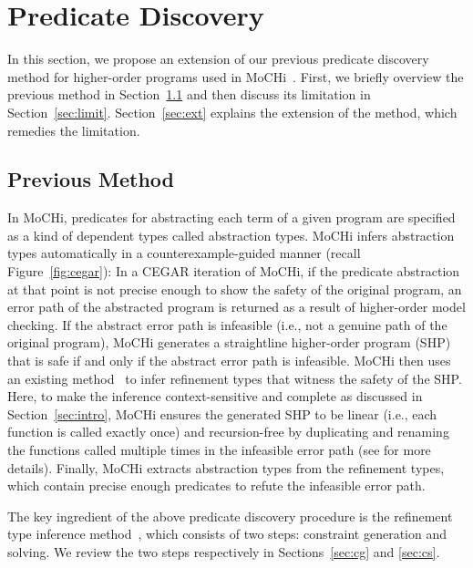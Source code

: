 

\section{Predicate Discovery}
\label{sec:refine}

In this section, we propose an extension of our previous predicate
discovery method for higher-order programs used in
MoCHi~\cite{KobayashiPLDI2011}.  First, we briefly overview the previous
method in Section~\ref{sec:prev} and then discuss its limitation in
Section~\ref{sec:limit}. Section~\ref{sec:ext} explains the extension of
the method, which remedies the limitation.

\subsection{Previous Method}
\label{sec:prev}

In MoCHi, predicates for abstracting each term of a given program are
specified as a kind of dependent types called abstraction types.  MoCHi
infers abstraction types automatically in a counterexample-guided manner
(recall Figure~\ref{fig:cegar}): In a CEGAR iteration of MoCHi, if the
predicate abstraction at that point is not precise enough to show the
safety of the original program, an error path of the abstracted program
is returned as a result of higher-order model checking.  If the abstract
error path is infeasible (i.e., not a genuine path of the original
program), MoCHi generates a straightline higher-order program (SHP)
that is safe if and only if the abstract error path is infeasible.
MoCHi then uses an existing method~\cite{Unno2009} to infer refinement
types that witness the safety of the SHP.  Here, to make the inference
context-sensitive and complete as discussed in Section~\ref{sec:intro},
MoCHi ensures the generated SHP to be linear (i.e., each function is
called exactly once) and recursion-free by duplicating and renaming the
functions called multiple times in the infeasible error path (see
\cite{KobayashiPLDI2011} for more details).  Finally, MoCHi extracts
abstraction types from the refinement types, which contain precise
enough predicates to refute the infeasible error path.

The key ingredient of the above predicate discovery procedure is the
refinement type inference method~\cite{Unno2009}, which consists of two
steps: constraint generation and solving.  We review the two steps
respectively in Sections~\ref{sec:cg} and \ref{sec:cs}.

